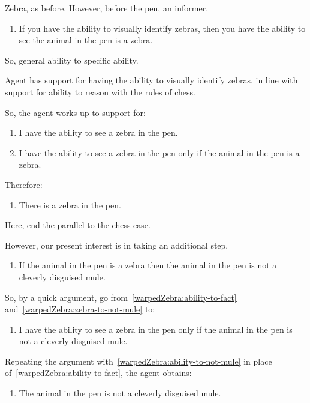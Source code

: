 \documentclass[10pt]{article}
\begin{document}
\begin{note}
  Zebra, as before.
  However, before the pen, an informer.
  \begin{enumerate}[label=(Z\arabic*), ref=(Z\arabic*)]
  \item If you have the ability to visually identify zebras, then you have the ability to see the animal in the pen is a zebra.
  \end{enumerate}
  So, general ability to specific ability.

  Agent has support for having the ability to visually identify zebras, in line with support for ability to reason with the rules of chess.

  So, the agent works up to support for:
  \begin{enumerate}[resume, label=(Z\arabic*), ref=(Z\arabic*)]
  \item I have the ability to see a zebra in the pen.
  \item\label{warpedZebra:ability-to-fact} I have the ability to see a zebra in the pen only if the animal in the pen is a zebra.
  \end{enumerate}
  Therefore:
  \begin{enumerate}[resume, label=(Z\arabic*), ref=(Z\arabic*)]
  \item There is a zebra in the pen.
  \end{enumerate}
  Here, end the parallel to the chess case.

  However, our present interest is in taking an additional step.

  \begin{enumerate}[resume, label=(Z\arabic*), ref=(Z\arabic*)]
  \item\label{warpedZebra:zebra-to-not-mule} If the animal in the pen is a zebra then the animal in the pen is not a cleverly disguised mule.
  \end{enumerate}
  So, by a quick argument, go from~\ref{warpedZebra:ability-to-fact} and~\ref{warpedZebra:zebra-to-not-mule} to:
  \begin{enumerate}[resume]
  \item\label{warpedZebra:ability-to-not-mule} I have the ability to see a zebra in the pen only if the animal in the pen is not a cleverly disguised mule.
  \end{enumerate}

  Repeating the argument with~\ref{warpedZebra:ability-to-not-mule} in place of~\ref{warpedZebra:ability-to-fact}, the agent obtains:
  \begin{enumerate}[resume, label=(Z\arabic*), ref=(Z\arabic*)]
  \item The animal in the pen is not a cleverly disguised mule.
  \end{enumerate}


\end{note}
\end{document}

